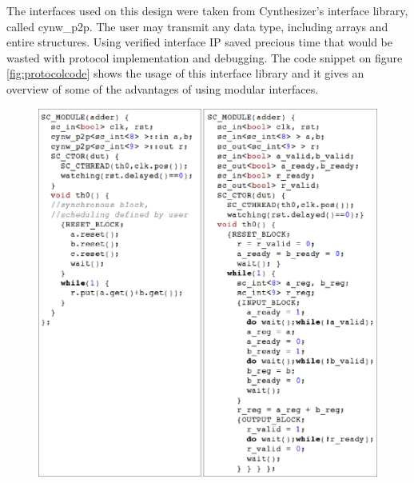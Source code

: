 \documentclass[a4paper, 12pt]{article}
\begin{document}
	The interfaces used on this design were taken from Cynthesizer's interface library, called cynw\_p2p. The user may transmit any data type, including arrays and entire structures. Using verified interface IP saved precious time that would be wasted with protocol implementation and debugging. The code snippet on figure \ref{fig:protocolcode} shows the usage of this interface library and it gives an overview of some of the advantages of using modular interfaces.

\begin{singlespace}
\begin{figure}[h!]
\includegraphics[width=15cm]{figs/p2pcode.eps}
%
%

\end{figure}
\end{singlespace}
\end{document}
